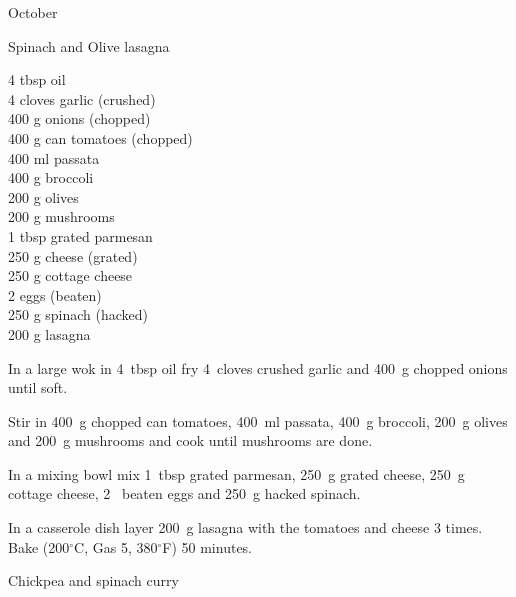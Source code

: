 \begin{menu}{October}
    \begin{recipe}{2}{Spinach and Olive lasagna}%
    
		\begin{ingredients}
		4 tbsp oil  \\
	4 cloves garlic (crushed) \\
	400 g onions (chopped) \\
	400 g can tomatoes (chopped) \\
	400 ml passata  \\
	400 g broccoli  \\
	200 g olives  \\
	200 g mushrooms  \\
	1 tbsp grated parmesan  \\
	250 g cheese (grated) \\
	250 g cottage cheese  \\
	2  eggs (beaten) \\
	250 g spinach (hacked) \\
	200 g lasagna  \\
	
		\end{ingredients}
	
	
    \begin{instructions}
    \item 
        In a large wok in
        4~tbsp  oil
        fry
        4~cloves crushed garlic
        and
        400~g chopped onions
        until soft.
      \item 
        Stir in
        400~g chopped can tomatoes,
        400~ml  passata,
        400~g  broccoli,
        200~g  olives
        and
        200~g  mushrooms
        and cook until mushrooms are done.
      \item 
        In a mixing bowl mix
        1~tbsp  grated parmesan,
        250~g grated cheese,
        250~g  cottage cheese,
        2~ beaten eggs
        and
        250~g hacked spinach.
      \item 
        In a casserole dish layer
        200~g  lasagna
        with the tomatoes and cheese 3 times.
        Bake 
      (200$^{\circ}$C, Gas 5, 380$^{\circ}$F)
     50 minutes.
      
    \end{instructions}
    \end{recipe}%
  
    \begin{recipe}{2}{Chickpea and spinach curry}%
    

\end{recipe}
\end{menu}
